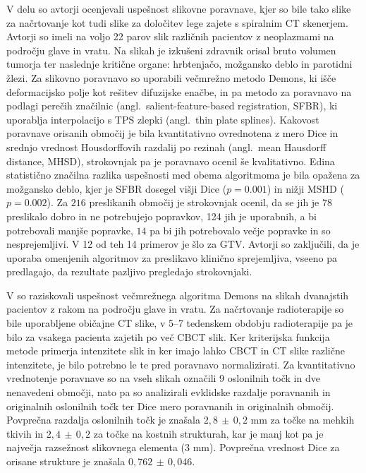 \documentclass[journal]{IEEEtran}
\begin{document}
V delu \cite{hardcastle2012} so avtorji ocenjevali uspešnost slikovne poravnave, kjer so bile tako slike za načrtovanje kot tudi slike za določitev lege zajete s spiralnim CT skenerjem. Avtorji so imeli na voljo 22 parov slik različnih pacientov z neoplazmami na področju glave in vratu. Na slikah je izkušeni zdravnik orisal bruto volumen tumorja ter naslednje kritične organe: hrbtenjačo, možgansko deblo in parotidni žlezi. Za slikovno poravnavo so uporabili večmrežno metodo Demons\cite{vercauteren2009}, ki išče deformacijsko polje kot rešitev difuzijske enačbe, in pa metodo za poravnavo na podlagi perečih značilnic (angl.~salient-feature-based registration, SFBR), ki uporablja interpolacijo s TPS zlepki (angl.~thin plate splines). Kakovost poravnave orisanih območij je bila kvantitativno ovrednotena z mero Dice in srednjo vrednost Housdorffovih razdalij po rezinah (angl.~mean Hausdorff distance, MHSD), strokovnjak pa je poravnavo ocenil še kvalitativno. Edina statistično značilna razlika uspešnosti med obema algoritmoma je bila opažena za možgansko deblo, kjer je SFBR dosegel višji Dice ($p=0.001$) in nižji MSHD ($p=0.002$). Za $216$ preslikanih območij je strokovnjak ocenil, da se jih je $78$ preslikalo dobro in ne potrebujejo popravkov, 124 jih je uporabnih, a bi potrebovali manjše popravke, $14$ pa bi jih potrebovalo večje popravke in so nesprejemljivi. V 12 od teh 14 primerov je šlo za GTV. Avtorji so zaključili, da je uporaba omenjenih algoritmov za preslikavo klinično sprejemljiva, vseeno pa predlagajo, da rezultate pazljivo pregledajo strokovnjaki.

V \cite{hou2011} so raziskovali uspešnost večmrežnega algoritma Demons na slikah dvanajstih pacientov z rakom na področju glave in vratu. Za načrtovanje radioterapije so bile uporabljene običajne CT slike, v 5--7 tedenskem obdobju radioterapije pa je bilo za vsakega pacienta zajetih po več CBCT slik. Ker kriterijska funkcija metode primerja intenzitete slik in ker imajo lahko CBCT in CT slike različne intenzitete, je bilo potrebno le te pred poravnavo normalizirati. Za kvantitativno vrednotenje poravnave so na vseh slikah označili 9 oslonilnih točk in dve nenavedeni območji, nato pa so analizirali evklidske razdalje poravnanih in originalnih oslonilnih točk ter Dice mero poravnanih in originalnih območij. Povprečna razdalja oslonilnih točk je znašala $2{,}8\,{\pm}\,0{,}2$ mm za točke na mehkih tkivih in $2{,}4\,{\pm}\,0{,}2$ za točke na kostnih strukturah, kar je manj kot pa je največja razsežnost slikovnega elementa ($3$ mm). Povprečna vrednost Dice za orisane strukture je znašala $0,762\,\pm\,0,046$.
\end{document}
